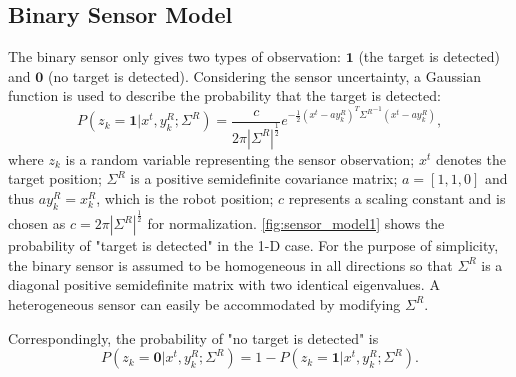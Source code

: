 \documentclass[twocolumn,10pt]{asme2e}
\begin{document}
\subsection*{Binary Sensor Model}
The binary sensor only gives two types of observation: $\mathbf{1}$ (the target is detected) and $\mathbf{0}$ (no target is detected).
Considering the sensor uncertainty, a Gaussian function is used to describe the probability that the target is detected:
\begin{equation}\label{eqn:sensor_model}
	P(z_k=\mathbf{1}|x^t,y_k^R;\Sigma^R) = \frac{c}{2\pi|\Sigma^R|^{\frac{1}{2}}}e^{-\frac{1}{2}(x^t-ay_k^R)^T{\Sigma^R}^{-1}(x^t-ay_k^R)},
\end{equation}
where $z_k$ is a random variable representing the sensor observation; 
$x^t$ denotes the target position; 
$\Sigma^R$ is a positive semidefinite covariance matrix; 
$a=[1,1,0]$ and thus $ay_k^R=x_k^R$, which is the robot position;
$c$ represents a scaling constant and is chosen as $c=2\pi|\Sigma^R|^{\frac{1}{2}}$ for normalization.
\cref{fig:sensor_model1} shows the probability of "target is detected" in the 1-D case.
For the purpose of simplicity, the binary sensor is assumed to be homogeneous in all directions so that $\Sigma^R$ is a diagonal positive semidefinite matrix with two identical eigenvalues.
A heterogeneous sensor can easily be accommodated by modifying $\Sigma^R$.

Correspondingly, the probability of "no target is detected" is
\begin{equation}\label{eqn:sensor_model_nD}
	P(z_k=\mathbf{0}|x^t,y_k^R;\Sigma^R) = 1-P(z_k=\mathbf{1}|x^t,y_k^R;\Sigma^R).
\end{equation}
\end{document}

